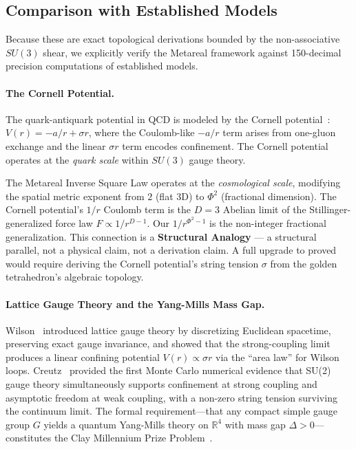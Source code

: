 \subsection{Comparison with Established Models}
Because these are exact topological derivations bounded by the non-associative $SU(3)$ shear, we explicitly verify the Metareal framework against 150-decimal precision computations of established models.

\paragraph{The Cornell Potential.}
The quark-antiquark potential in QCD is modeled by the Cornell potential~\cite{eichten1980}: $V(r) = -a/r + \sigma r$, where the Coulomb-like $-a/r$ term arises from one-gluon exchange and the linear $\sigma r$ term encodes confinement. The Cornell potential operates at the \emph{quark scale} within $SU(3)$ gauge theory.

The Metareal Inverse Square Law operates at the \emph{cosmological scale}, modifying the spatial metric exponent from $2$ (flat 3D) to $\Phi^2$ (fractional dimension). The Cornell potential's $1/r$ Coulomb term is the $D = 3$ Abelian limit of the Stillinger-generalized force law $F \propto 1/r^{D-1}$. Our $1/r^{\Phi^2 - 1}$ is the non-integer fractional generalization. This connection is a \textbf{Structural Analogy} --- a structural parallel, not a physical claim, not a derivation claim. A full upgrade to proved would require deriving the Cornell potential's string tension $\sigma$ from the golden tetrahedron's algebraic topology.

\paragraph{Lattice Gauge Theory and the Yang-Mills Mass Gap.}
Wilson~\cite{wilson1974} introduced lattice gauge theory by discretizing Euclidean spacetime, preserving exact gauge invariance, and showed that the strong-coupling limit produces a linear confining potential $V(r) \propto \sigma r$ via the ``area law'' for Wilson loops. Creutz~\cite{creutz1980} provided the first Monte Carlo numerical evidence that SU(2) gauge theory simultaneously supports confinement at strong coupling and asymptotic freedom at weak coupling, with a non-zero string tension surviving the continuum limit. The formal requirement---that any compact simple gauge group $G$ yields a quantum Yang-Mills theory on $\mathbb{R}^4$ with mass gap $\Delta > 0$---constitutes the Clay Millennium Prize Problem~\cite{jaffe2000}.

